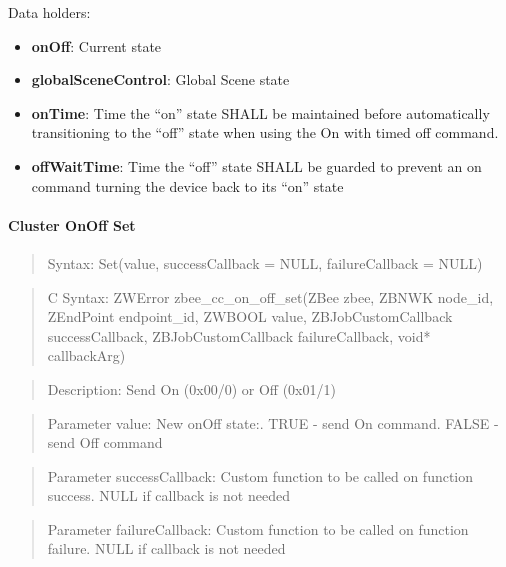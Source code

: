 \noindent
Data holders:

\begin{itemize}
\item \textbf{onOff}: Current state
\item \textbf{globalSceneControl}: Global Scene state
\item \textbf{onTime}: Time the “on” state SHALL be maintained before automatically transitioning to the “off” state when using the On with timed off command.
\item \textbf{offWaitTime}: Time the “off” state SHALL be guarded to prevent an on command turning the device back to its “on” state
\end{itemize}

\paragraph{Cluster OnOff Set}
\begin{quote}Syntax: Set(value, successCallback = NULL, failureCallback = NULL)\end{quote}
\begin{quote}C Syntax: ZWError zbee\_cc\_on\_off\_set(ZBee zbee, ZBNWK node\_id, ZEndPoint endpoint\_id, ZWBOOL value, ZBJobCustomCallback successCallback, ZBJobCustomCallback failureCallback, void* callbackArg)\end{quote}
\begin{quote}Description: Send On (0x00/0) or Off (0x01/1)\end{quote}
\begin{quote}Parameter value: New onOff state:. TRUE  - send On command. FALSE - send Off command\end{quote}
\begin{quote}Parameter successCallback: Custom function to be called on function success. NULL if callback is not needed\end{quote}
\begin{quote}Parameter failureCallback: Custom function to be called on function failure. NULL if callback is not needed\end{quote}


